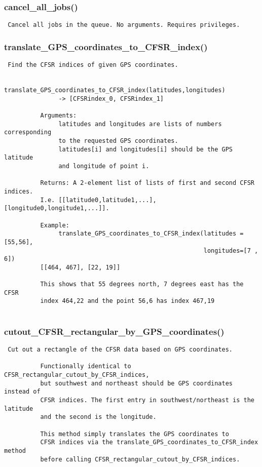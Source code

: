 \subsubsection{cancel\_all\_jobs()}


\begin{verbatim}
 Cancel all jobs in the queue. No arguments. Requires privileges. 
\end{verbatim}
\subsubsection{translate\_GPS\_coordinates\_to\_CFSR\_index()}


\begin{verbatim}
 Find the CFSR indices of given GPS coordinates.
          
          translate_GPS_coordinates_to_CFSR_index(latitudes,longitudes)
               -> [CFSRindex_0, CFSRindex_1]

          Arguments:
               latitudes and longitudes are lists of numbers corresponding
               to the requested GPS coordinates.
               latitudes[i] and longitudes[i] should be the GPS latitude
               and longitude of point i.

          Returns: A 2-element list of lists of first and second CFSR indices.
          I.e. [[latitude0,latitude1,...], [longitude0,longitude1,...]]. 
          
          Example:
               translate_GPS_coordinates_to_CFSR_index(latitudes =[55,56],
                                                       longitudes=[7 , 6])
          [[464, 467], [22, 19]]

          This shows that 55 degrees north, 7 degrees east has the CFSR
          index 464,22 and the point 56,6 has index 467,19
          
\end{verbatim}
\subsubsection{cutout\_CFSR\_rectangular\_by\_GPS\_coordinates()}


\begin{verbatim}
 Cut out a rectangle of the CFSR data based on GPS coordinates.
          
          Functionally identical to CFSR_rectangular_cutout_by_CFSR_indices,
          but southwest and northeast should be GPS coordinates instead of 
          CFSR indices. The first entry in southwest/northeast is the latitude
          and the second is the longitude.
         
          This method simply translates the GPS coordinates to
          CFSR indices via the translate_GPS_coordinates_to_CFSR_index method
          before calling CFSR_rectangular_cutout_by_CFSR_indices.
          
\end{verbatim}
